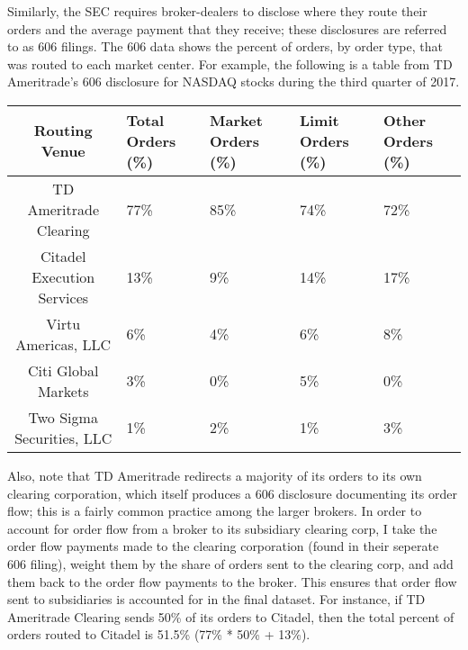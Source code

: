 \documentclass[12pt,a4paper]{article}
\begin{document}
		Similarly, the SEC requires broker-dealers to disclose where they route their orders and the average payment that they receive; these disclosures are referred to as 606 filings. The 606 data shows the percent of orders, by order type, that was routed to each market center. For example, the following is a table from TD Ameritrade's 606 disclosure for NASDAQ stocks during the third quarter of 2017. 
		\small
		\begin{center}
			\begin{singlespace}
				\begin{tabular}{| c |  C{2cm} | C{2cm} | C{2cm} | C{2cm} |}
					\hline
					\textbf{Routing Venue} & Total Orders (\%) & Market Orders (\%) & Limit Orders (\%)&  Other Orders (\%) \\ \hline
					TD Ameritrade Clearing & 77\%  & 85\% &  74\%  & 72\%   \\ \hline
					Citadel Execution Services &  13\% &  9\%  & 14\%  & 17\%   \\ \hline
					Virtu Americas, LLC  & 6\% &  4\%  & 6\%  & 8\%   \\ \hline
					Citi Global Markets  & 3\%  & 0\%  & 5\% &  0\%   \\ \hline
					Two Sigma Securities, LLC  & 1\%  & 2\%  & 1\%  & 3\%   \\ 
					\hline
				\end{tabular}
			\end{singlespace}
		\end{center}
		\normalsize
		\vspace{1em}
		Also, note that TD Ameritrade redirects a majority of its orders to its own clearing corporation, which itself produces a 606 disclosure documenting its order flow; this is a fairly common practice among the larger brokers. In order to account for order flow from a broker to its subsidiary clearing corp, I take the order flow payments made to the clearing corporation (found in their seperate 606 filing), weight them by the share of orders sent to the clearing corp, and add them back to the order flow payments to the broker. This ensures that order flow sent to subsidiaries is accounted for in the final dataset. For instance, if TD Ameritrade Clearing sends 50\% of its orders to Citadel, then the total percent of orders routed to Citadel is 51.5\% (77\% * 50\% + 13\%).  
		
\end{document}
